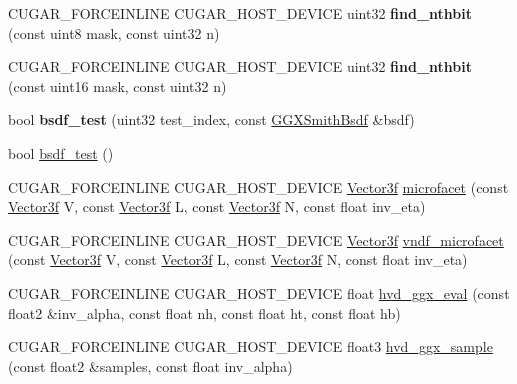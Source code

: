 \begin{DoxyCompactItemize}
\item 
\mbox{\label{namespacecugar_a9c97b8f3f0ad3a2dc4a895084c1c7d66}} 
C\+U\+G\+A\+R\+\_\+\+F\+O\+R\+C\+E\+I\+N\+L\+I\+NE C\+U\+G\+A\+R\+\_\+\+H\+O\+S\+T\+\_\+\+D\+E\+V\+I\+CE uint32 {\bfseries find\+\_\+nthbit} (const uint8 mask, const uint32 n)
\item 
\mbox{\label{namespacecugar_a1d56dac605640667742b555abfd29e6c}} 
C\+U\+G\+A\+R\+\_\+\+F\+O\+R\+C\+E\+I\+N\+L\+I\+NE C\+U\+G\+A\+R\+\_\+\+H\+O\+S\+T\+\_\+\+D\+E\+V\+I\+CE uint32 {\bfseries find\+\_\+nthbit} (const uint16 mask, const uint32 n)
\item 
bool {\bfseries bsdf\+\_\+test} (uint32 test\+\_\+index, const \hyperlink{structcugar_1_1_g_g_x_smith_bsdf}{G\+G\+X\+Smith\+Bsdf} \&bsdf)
\item 
bool \hyperlink{group___b_s_d_f_module_ga6f553010172240343aa0890f04b7192c}{bsdf\+\_\+test} ()
\item 
C\+U\+G\+A\+R\+\_\+\+F\+O\+R\+C\+E\+I\+N\+L\+I\+NE C\+U\+G\+A\+R\+\_\+\+H\+O\+S\+T\+\_\+\+D\+E\+V\+I\+CE \hyperlink{structcugar_1_1_vector}{Vector3f} \hyperlink{group___b_s_d_f_module_gae47d332728711dde1d05b721b74267f7}{microfacet} (const \hyperlink{structcugar_1_1_vector}{Vector3f} V, const \hyperlink{structcugar_1_1_vector}{Vector3f} L, const \hyperlink{structcugar_1_1_vector}{Vector3f} N, const float inv\+\_\+eta)
\item 
C\+U\+G\+A\+R\+\_\+\+F\+O\+R\+C\+E\+I\+N\+L\+I\+NE C\+U\+G\+A\+R\+\_\+\+H\+O\+S\+T\+\_\+\+D\+E\+V\+I\+CE \hyperlink{structcugar_1_1_vector}{Vector3f} \hyperlink{group___b_s_d_f_module_gaa871796466d7998c178e28e2eccd7248}{vndf\+\_\+microfacet} (const \hyperlink{structcugar_1_1_vector}{Vector3f} V, const \hyperlink{structcugar_1_1_vector}{Vector3f} L, const \hyperlink{structcugar_1_1_vector}{Vector3f} N, const float inv\+\_\+eta)
\item 
C\+U\+G\+A\+R\+\_\+\+F\+O\+R\+C\+E\+I\+N\+L\+I\+NE C\+U\+G\+A\+R\+\_\+\+H\+O\+S\+T\+\_\+\+D\+E\+V\+I\+CE float \hyperlink{group___b_s_d_f_module_ga985268a447aa898cd2f2e1c792d9ddff}{hvd\+\_\+ggx\+\_\+eval} (const float2 \&inv\+\_\+alpha, const float nh, const float ht, const float hb)
\item 
C\+U\+G\+A\+R\+\_\+\+F\+O\+R\+C\+E\+I\+N\+L\+I\+NE C\+U\+G\+A\+R\+\_\+\+H\+O\+S\+T\+\_\+\+D\+E\+V\+I\+CE float3 \hyperlink{group___b_s_d_f_module_ga49eab615e64e73c409bb285fd95c56c3}{hvd\+\_\+ggx\+\_\+sample} (const float2 \&samples, const float inv\+\_\+alpha)

\end{DoxyCompactItemize}
